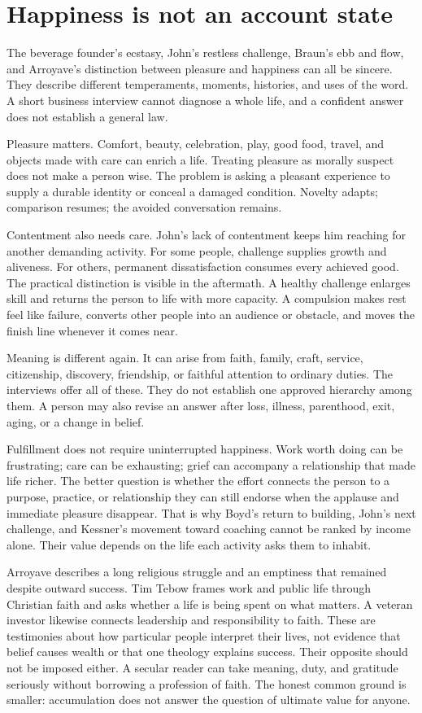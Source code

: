 \section{Happiness is not an account state}

The beverage founder's ecstasy, John's restless challenge, Braun's ebb and
flow, and Arroyave's distinction between pleasure and happiness can all be
sincere. They describe different temperaments, moments, histories, and uses of
the word. A short business interview cannot diagnose a whole life, and a
confident answer does not establish a general law.

Pleasure matters. Comfort, beauty, celebration, play, good food, travel, and
objects made with care can enrich a life. Treating pleasure as morally suspect
does not make a person wise. The problem is asking a pleasant experience to
supply a durable identity or conceal a damaged condition. Novelty adapts;
comparison resumes; the avoided conversation remains.

Contentment also needs care. John's lack of contentment keeps him reaching for
another demanding activity. For some people, challenge supplies growth and
aliveness. For others, permanent dissatisfaction consumes every achieved
good. The practical distinction is visible in the aftermath. A healthy
challenge enlarges skill and returns the person to life with more capacity. A
compulsion makes rest feel like failure, converts other people into an
audience or obstacle, and moves the finish line whenever it comes near.

Meaning is different again. It can arise from faith, family, craft, service,
citizenship, discovery, friendship, or faithful attention to ordinary duties.
The interviews offer all of these. They do not establish one approved
hierarchy among them. A person may also revise an answer after loss, illness,
parenthood, exit, aging, or a change in belief.

Fulfillment does not require uninterrupted happiness. Work worth doing can be
frustrating; care can be exhausting; grief can accompany a relationship that
made life richer. The better question is whether the effort connects the
person to a purpose, practice, or relationship they can still endorse when the
applause and immediate pleasure disappear. That is why Boyd's return to
building, John's next challenge, and Kessner's movement toward coaching cannot
be ranked by income alone. Their value depends on the life each activity asks
them to inhabit.

Arroyave describes a long religious struggle and an emptiness that remained
despite outward success. Tim Tebow frames work and public life through
Christian faith and asks whether a life is being spent on what matters. A
veteran investor likewise connects leadership and responsibility to faith.
These are testimonies about how particular people interpret their lives, not
evidence that belief causes wealth or that one theology explains success.
Their opposite should not be imposed either. A secular reader can take
meaning, duty, and gratitude seriously without borrowing a profession of
faith. The honest common ground is smaller: accumulation does not answer the
question of ultimate value for anyone.

